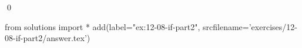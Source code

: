 
\begin{ex}
  \label{ex:12-08-if-part2}
  
  \qed
\end{ex}
\begin{python0}
from solutions import *
add(label="ex:12-08-if-part2",
    srcfilename='exercises/12-08-if-part2/answer.tex')
\end{python0}
